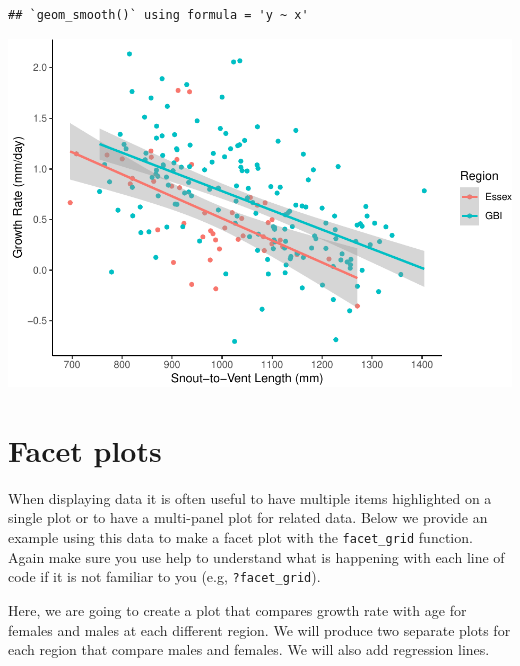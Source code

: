 \documentclass[
]{book}
\begin{document}
\begin{verbatim}
## `geom_smooth()` using formula = 'y ~ x'
\end{verbatim}

\includegraphics{series_files/figure-latex/unnamed-chunk-27-1.pdf}

\hypertarget{facet-plots}{%
\section{Facet plots}\label{facet-plots}}

When displaying data it is often useful to have multiple items highlighted on a single plot or to have a multi-panel plot for related data. Below we provide an example using this data to make a facet plot with the \texttt{facet\_grid} function. Again make sure you use help to understand what is happening with each line of code if it is not familiar to you (e.g, \texttt{?facet\_grid}).

Here, we are going to create a plot that compares growth rate with age for females and males at each different region. We will produce two separate plots for each region that compare males and females. We will also add regression lines.
\end{document}
